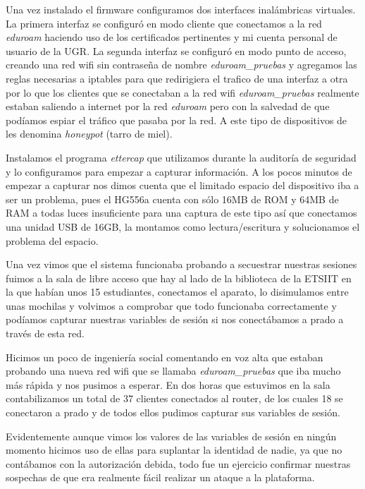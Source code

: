 \bigskip
Una vez instalado el firmware configuramos dos interfaces inalámbricas virtuales. La primera interfaz se configuró en modo cliente que conectamos a la red \textit{eduroam} haciendo uso de los certificados pertinentes y mi cuenta personal de usuario de la UGR. La segunda interfaz se configuró en modo punto de acceso, creando una red wifi sin contraseña de nombre \textit{eduroam\_pruebas} y agregamos las reglas necesarias a iptables para que redirigiera el trafico de una interfaz a otra por lo que los clientes que se conectaban a la red wifi \textit{eduroam\_pruebas} realmente estaban saliendo a internet por la red \textit{eduroam} pero con la salvedad de que podíamos espiar el tráfico que pasaba por la red. A este tipo de dispositivos de les denomina \textit{honeypot} (tarro de miel). 

\bigskip
Instalamos el programa \textit{ettercap} que utilizamos durante la auditoría de seguridad y lo configuramos para empezar a capturar información. A los pocos minutos de empezar a capturar nos dimos cuenta que el limitado espacio del dispositivo iba a ser un problema, pues el HG556a cuenta con sólo 16MB de ROM y 64MB de RAM a todas luces insuficiente para una captura de este tipo así que conectamos una unidad USB de 16GB, la montamos como lectura/escritura y solucionamos el problema del espacio. 

\bigskip
Una vez vimos que el sistema funcionaba probando a secuestrar nuestras sesiones fuimos a la sala de libre acceso que hay al lado de la biblioteca de la ETSIIT en la que habían unos 15 estudiantes, conectamos el aparato, lo disimulamos entre unas mochilas y volvimos a comprobar que todo funcionaba correctamente y podíamos capturar nuestras variables de sesión si nos conectábamos a prado a través de esta red. 

\bigskip
Hicimos un poco de ingeniería social comentando en voz alta que estaban probando una nueva red wifi que se llamaba \textit{eduroam\_pruebas} que iba mucho más rápida y nos pusimos a esperar. En dos horas que estuvimos en la sala contabilizamos un total de 37 clientes conectados al router, de los cuales 18 se conectaron a prado y de todos ellos pudimos capturar sus variables de sesión. 

\bigskip
Evidentemente aunque vimos los valores de las variables de sesión en ningún momento hicimos uso de ellas para suplantar la identidad de nadie, ya que no contábamos con la autorización debida, todo fue un ejercicio confirmar nuestras sospechas de que era realmente fácil realizar un ataque a la plataforma.




